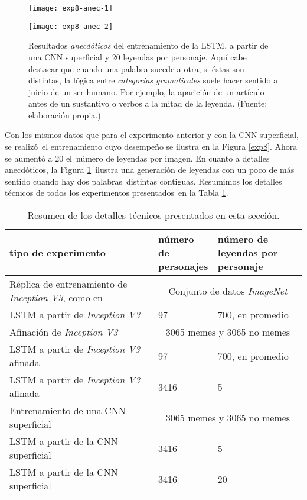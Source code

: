 \begin{figure}[H]
  \begin{minipage}[c]{\linewidth}
    \texttt{[image: exp8-anec-1]}
  \end{minipage}\hfill
  \begin{minipage}[c]{\linewidth}
    \texttt{[image: exp8-anec-2]}
  \end{minipage}
  \caption[Nota al pie]{
    Resultados \emph{anecdóticos} del entrenamiento de la LSTM, a partir de una CNN superficial
    y 20 leyendas por personaje. Aquí cabe destacar que cuando una palabra sucede a otra, si éstas son distintas,
    la lógica entre \emph{categorías gramaticales} suele hacer sentido a juicio de un ser humano.
    Por ejemplo, la aparición de un artículo antes de un sustantivo o verbos a la mitad de la leyenda.
    (Fuente: elaboración propia.)
  }
  \label{exp8:anec}
\end{figure}

Con los mismos datos que para el experimento anterior y con la CNN superficial, se realizó\
el entrenamiento cuyo desempeño se ilustra en la Figura \ref{exp8}. Ahora se aumentó a 20 el\
número de leyendas por imagen. En cuanto a detalles anecdóticos, la Figura \ref{exp8:anec}\
ilustra una generación de leyendas con un poco de más sentido cuando hay dos palabras\
distintas contiguas. Resumimos los detalles técnicos de todos los experimentos presentados\
en la Tabla \ref{exp-details}.

\begin{table}[H]
  \begin{tabular}{|p{0.5\linewidth}|p{0.2\linewidth}|p{0.3\linewidth}|}
    \hline
    \textbf{tipo de experimento} & \textbf{número de personajes} & \textbf{número de leyendas por personaje}\\
    \hline \hline
    Réplica de entrenamiento de \emph{Inception V3}, como en \cite{DBLP:journals/corr/VinyalsTBE16} & \multicolumn{2}{|c|}{Conjunto de datos \emph{ImageNet}} \\
    \hline
    LSTM a partir de \emph{Inception V3} & 97 & 700, en promedio \\
    \hline
    Afinación de \emph{Inception V3} & \multicolumn{2}{|c|}{3065 memes y 3065 no memes} \\
    \hline
    LSTM a partir de \emph{Inception V3} afinada & 97 & 700, en promedio \\
    \hline
    LSTM a partir de \emph{Inception V3} afinada & 3416 & 5 \\
    \hline
    Entrenamiento de una CNN superficial & \multicolumn{2}{|c|}{3065 memes y 3065 no memes} \\
    \hline
    LSTM a partir de la CNN superficial & 3416 & 5 \\
    \hline
    LSTM a partir de la CNN superficial & 3416 & 20 \\
    \hline
  \end{tabular}
  \caption{
    Resumen de los detalles técnicos presentados en esta sección.
  }
  \label{exp-details}
\end{table}

